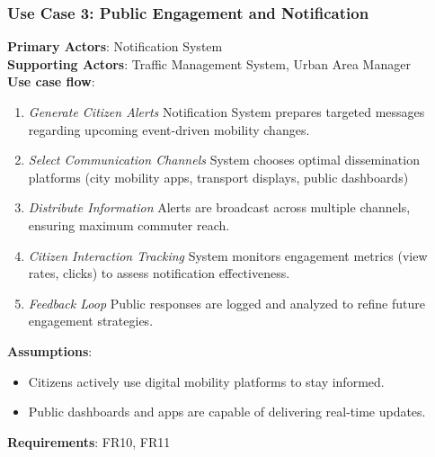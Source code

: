 \documentclass[a4paper,12pt]{article}
\begin{document}
\subsubsection*{Use Case 3: Public Engagement and Notification}
\textbf{Primary Actors}: Notification System \\
\textbf{Supporting Actors}: Traffic Management System, Urban Area Manager\\
\textbf{Use case flow}: 
\begin{enumerate}
    \item \textit{Generate Citizen Alerts}  Notification System prepares targeted messages regarding upcoming event-driven mobility changes.
    \item \textit{Select Communication Channels} System chooses optimal dissemination platforms (city mobility apps, transport displays, public dashboards)
    \item \textit{Distribute Information} Alerts are broadcast across multiple channels, ensuring maximum commuter reach.
    \item \textit{Citizen Interaction Tracking} System monitors engagement metrics (view rates, clicks) to assess notification effectiveness.
    \item \textit{Feedback Loop}  Public responses are logged and analyzed to refine future engagement strategies.
\end{enumerate}
\textbf{Assumptions}: 
\begin{itemize}
    \item Citizens actively use digital mobility platforms to stay informed.
    \item Public dashboards and apps are capable of delivering real-time updates.
\end{itemize}
\textbf{Requirements}: FR10, FR11
\\
\newpage
\end{document}

